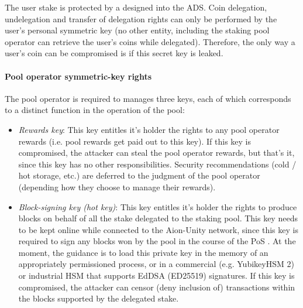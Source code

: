 The user stake is protected by a  designed into the ADS. Coin delegation, undelegation and transfer of delegation rights can only be performed by the user's personal symmetric key (no other entity, including the staking pool operator can retrieve the user's coins while delegated). Therefore, the only way a user's coin can be compromised is if this secret key is leaked.  
    
\paragraph{Pool operator symmetric-key rights} The pool operator is required to manages three keys, each of which corresponds to a distinct function in the operation of the pool: 
\begin{itemize}
    \item \textit{Rewards key}: This key entitles it's holder the rights to any pool operator rewards (i.e. pool rewards get paid out to this key). If this key is compromised, the attacker can steal the pool operator rewards, but that's it, since this key has no other responsibilities. Security recommendations (cold / hot storage, etc.) are deferred to the judgment of the pool operator (depending how they choose to manage their rewards). 
    \item \textit{Block-signing key (hot key)}: This key entitles it's holder the rights to produce blocks on behalf of all the stake delegated to the staking pool. This key needs to be kept online while connected to the Aion-Unity network, since this key is required to sign any blocks won by the pool in the course of the PoS . At the moment, the guidance is to load this private key in the memory of an appropriately permissioned process, or in a commercial (e.g. YubikeyHSM 2) or industrial HSM that supports EdDSA (ED25519) signatures. If this key is compromised, the attacker can censor (deny inclusion of) transactions within the blocks supported by the delegated stake. 

\end{itemize}
